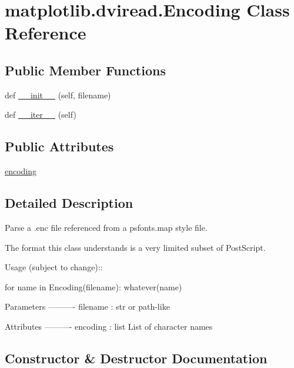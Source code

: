 \hypertarget{classmatplotlib_1_1dviread_1_1Encoding}{}\section{matplotlib.\+dviread.\+Encoding Class Reference}
\label{classmatplotlib_1_1dviread_1_1Encoding}
\subsection*{Public Member Functions}
\begin{DoxyCompactItemize}
\item 
def \hyperlink{classmatplotlib_1_1dviread_1_1Encoding_aa9b20be2e9c837a8c88c5d373bdb0602}{\+\_\+\+\_\+init\+\_\+\+\_\+} (self, filename)
\item 
def \hyperlink{classmatplotlib_1_1dviread_1_1Encoding_a52525e75c6870ef2cb7a5200dc98e1c8}{\+\_\+\+\_\+iter\+\_\+\+\_\+} (self)
\end{DoxyCompactItemize}
\subsection*{Public Attributes}
\begin{DoxyCompactItemize}
\item 
\hyperlink{classmatplotlib_1_1dviread_1_1Encoding_aa4f3d3a5d8b24c7de2ddaadcbdeb4e6f}{encoding}
\end{DoxyCompactItemize}


\subsection{Detailed Description}
\begin{DoxyVerb}Parse a \*.enc file referenced from a psfonts.map style file.

The format this class understands is a very limited subset of PostScript.

Usage (subject to change)::

  for name in Encoding(filename):
      whatever(name)

Parameters
----------
filename : str or path-like

Attributes
----------
encoding : list
    List of character names
\end{DoxyVerb}
 

\subsection{Constructor \& Destructor Documentation}
\mbox{\label{classmatplotlib_1_1dviread_1_1Encoding_aa9b20be2e9c837a8c88c5d373bdb0602}} 
